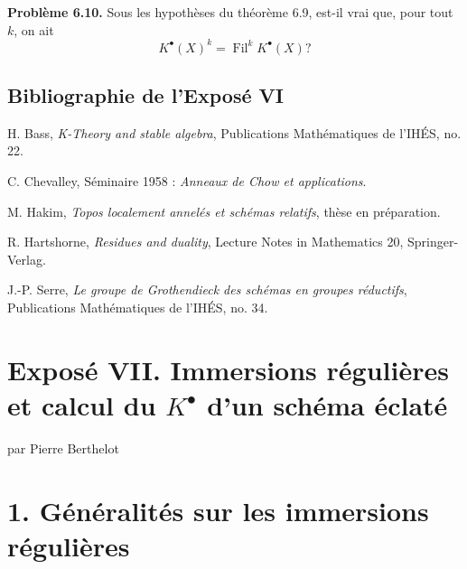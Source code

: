 \documentclass[11pt]{article}
\newcommand{\Fil}{\operatorname{Fil}}
\newcommand{\Tor}{\operatorname{Tor}}
\newcommand{\Spec}{\operatorname{Spec}}
\providecommand{\rad}{\operatorname{rad}}
\providecommand{\Tor}{\operatorname{Tor}}
\providecommand{\Ker}{\operatorname{Ker}}
\providecommand{\cO}{\mathcal O}
\begin{document}
\textbf{Problème 6.10.} Sous les hypothèses du théorème 6.9, est-il vrai que, pour tout \(k\), on ait
\[
  K^\bullet(X)^k=\Fil^kK^\bullet(X)?
\]

\subsection*{Bibliographie de l'Exposé VI}
\begin{enumerate}[label={\textup{[\arabic*]}}]
\item H. Bass, \emph{K-Theory and stable algebra}, Publications Mathématiques de l'IHÉS, no. 22.
\item C. Chevalley, Séminaire 1958 : \emph{Anneaux de Chow et applications}.
\item M. Hakim, \emph{Topos localement annelés et schémas relatifs}, thèse en préparation.
\item R. Hartshorne, \emph{Residues and duality}, Lecture Notes in Mathematics 20, Springer-Verlag.
\item J.-P. Serre, \emph{Le groupe de Grothendieck des schémas en groupes réductifs}, Publications Mathématiques de l'IHÉS, no. 34.
\end{enumerate}



\providecommand{\Kosz}{\mathrm K}
\providecommand{\Proj}{\operatorname{Proj}}
\providecommand{\Sym}{\operatorname{Sym}}
\providecommand{\gr}{\operatorname{gr}}
\providecommand{\Tor}{\operatorname{Tor}}
\providecommand{\Spec}{\operatorname{Spec}}
\providecommand{\Imf}{\operatorname{Im}}
\providecommand{\Ker}{\operatorname{Ker}}
\providecommand{\Id}{\operatorname{Id}}
\providecommand{\rad}{\operatorname{rad}}
\providecommand{\cO}{\mathcal O}
\providecommand{\cS}{\mathcal S}
\providecommand{\cJ}{\mathcal J}
\providecommand{\cN}{\mathcal N}
\providecommand{\bfP}{\mathbf P}
\providecommand{\bfA}{\mathbf A}


\section*{Exposé VII. Immersions régulières et calcul du \texorpdfstring{$K^\bullet$}{K} d'un schéma éclaté}
\begin{center}
par Pierre Berthelot
\end{center}

\section*{1. Généralités sur les immersions régulières}
\end{document}
